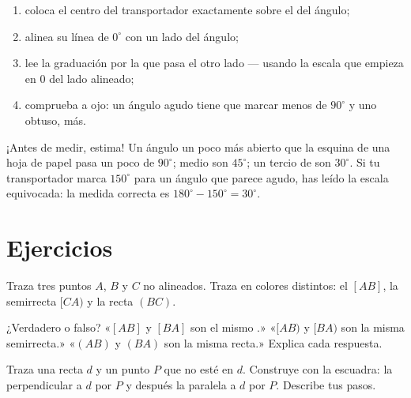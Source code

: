 \begin{method}\label{met:g6:lines:protractor}
\begin{enumerate}
  \item coloca el centro del transportador exactamente sobre el  del
        ángulo;
  \item alinea su línea de $0^\circ$ con un lado del ángulo;
  \item lee la graduación por la que pasa el otro lado --- usando la
        escala que empieza en $0$ del lado alineado;
  \item comprueba a ojo: un ángulo agudo tiene que marcar menos de
        $90^\circ$ y uno obtuso, más.
\end{enumerate}
\end{method}

\begin{example}\label{ex:g6:lines:estimate}
¡Antes de medir, estima! Un ángulo un poco más abierto que la esquina
de una hoja de papel pasa un poco de $90^\circ$; medio  son
$45^\circ$; un tercio de  son $30^\circ$. Si tu transportador
marca $150^\circ$ para un ángulo que parece agudo, has leído la escala
equivocada: la medida correcta es $180^\circ - 150^\circ = 30^\circ$.
\end{example}

\section{Ejercicios}

\begin{exercise}[$\star$]\label{exo:g6:lines:1}
Traza tres puntos $A$, $B$ y $C$ no alineados. Traza en colores distintos:
el  $[AB]$, la semirrecta $[CA)$ y la recta $(BC)$.
\end{exercise}

\begin{exercise}[$\star$]\label{exo:g6:lines:2}
¿Verdadero o falso? «$[AB]$ y $[BA]$ son el mismo .»
«$[AB)$ y $[BA)$ son la misma semirrecta.» «$(AB)$ y $(BA)$ son la
misma recta.» Explica cada respuesta.
\end{exercise}

\begin{exercise}[$\star$]\label{exo:g6:lines:3}
Traza una recta $d$ y un punto $P$ que no esté en $d$. Construye con la
escuadra: la perpendicular a $d$ por $P$ y después la paralela a $d$
por $P$. Describe tus pasos.
\end{exercise}

